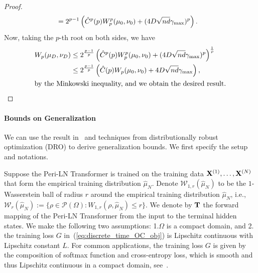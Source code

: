 \documentclass[journal]{IEEEtran}
\def\eqref#1{equation~\ref{#1}}
\newcommand{\bfT}{{\bf T}}
\newcommand{\bfX}{{\bf X}}
\renewcommand{\eqref}[1]{(\ref{#1})}
\theoremstyle{plain}
\theoremstyle{definition}
\theoremstyle{remark}
\begin{document}
\begin{proof}
\begin{align*}
        &= 2^{p-1} \left( \hat{C}^p(p) W_p^p(\mu_0,\nu_0) + (4 D \sqrt{nd} \gamma_{\rm max})^p \right).
    \end{align*}
    Now, taking the $p$-th root on both sides, we have
    \begin{align*}
        W_p(\mu_D,\nu_D) &\leq 2^{\frac{p-1}{p}} \left( \hat{C}^p(p) W_p^p(\mu_0,\nu_0) + (4 D \sqrt{nd} \gamma_{\rm max})^p \right)^{\frac{1}{p}} \\
        &\leq 2^{\frac{p-1}{p}} \left( \hat{C}(p) W_p(\mu_0,\nu_0) + 4 D \sqrt{nd} \gamma_{\rm max} \right), \\
        \intertext{by the Minkowski inequality, and we obtain the desired result.}
    \end{align*}
\end{proof} 

\paragraph{Bounds on Generalization} We can use the result in~ and techniques from distributionally robust optimization (DRO) to derive generalization bounds. We first specify the setup and notations.

Suppose the Peri-LN Transformer is trained on the training data $\bfX^{(1)}, \dots, \bfX^{(N)}$ that form the empirical training distribution $\hat{\mu}_N$. Denote $\mathcal{W}_{1,r}(\hat{\mu}_N)$ to be the $1$-Wasserstein ball of radius $r$ around the empirical training distribution $\hat{\mu}_N$, i.e., $\mathcal{W}_r(\hat{\mu}_N):= \{\rho \in \mathcal{P}(\Omega) : W_{1,r}(\rho,\hat{\mu}_N) \le r \}$. We denote by $\bfT$ the forward mapping of the Peri-LN Transformer from the input to the terminal hidden states. We make the following two assumptions: 1.$\Omega$ is a compact domain, and 2. the training loss $G$ in~\eqref{eq:discrete_time_OC_obj} is Lipschitz continuous with Lipschitz constant $L$. For common applications, the training loss $G$ is given by the composition of softmax function and cross-entropy loss, which is smooth and thus Lipschitz continuous in a compact domain, see~\cite{Kan2024LSEMINK}.
\end{document}
